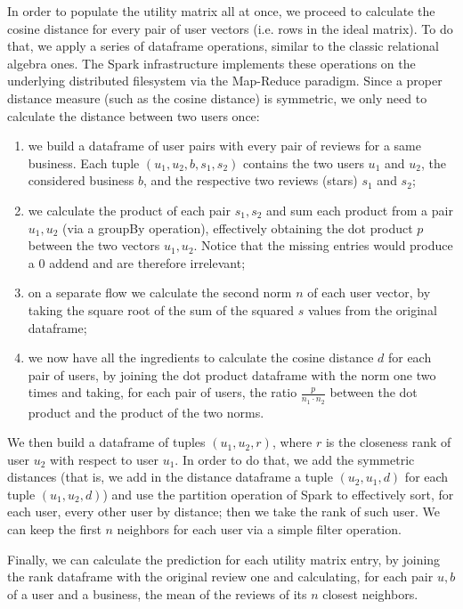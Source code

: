 \documentclass[11pt,a4paper]{article}
\begin{document}
\begin{multicols}{2}
In order to populate the utility matrix all at once, we proceed to calculate the cosine distance for every pair of user vectors (i.e. rows in the ideal matrix).
To do that, we apply a series of dataframe operations, similar to the classic relational algebra ones. The Spark infrastructure implements these operations on the underlying distributed filesystem via the Map-Reduce paradigm.
Since a proper distance measure (such as the cosine distance) is symmetric, we only need to calculate the distance between two users once:
\begin{enumerate}
	\item we build a dataframe of user pairs with every pair of reviews for a same business. Each tuple $(u_1,u_2,b,s_1,s_2)$ contains the two users $u_1$ and $u_2$, the considered business $b$, and the respective two reviews (stars) $s_1$ and $s_2$;
	\item we calculate the product of each pair $s_1,s_2$ and sum each product from a pair $u_1,u_2$ (via a groupBy operation), effectively obtaining the dot product $p$ between the two vectors $u_1,u_2$. Notice that the missing entries would produce a $0$ addend and are therefore irrelevant;
	\item on a separate flow we calculate the second norm $n$ of each user vector, by taking the square root of the sum of the squared $s$ values from the original dataframe;
	\item we now have all the ingredients to calculate the cosine distance $d$ for each pair of users, by joining the dot product dataframe with the norm one two times and taking, for each pair of users, the ratio $\frac{p}{n_1\cdot n_2}$ between the dot product and the product of the two norms.
\end{enumerate}

We then build a dataframe of tuples $(u_1,u_2,r)$, where $r$ is the closeness rank of user $u_2$ with respect to user $u_1$.
In order to do that, we add the symmetric distances (that is, we add in the distance dataframe a tuple $(u_2,u_1,d)$ for each tuple $(u_1,u_2,d)$) and use the partition operation of Spark to effectively sort, for each user, every other user by distance; then we take the rank of such user.
We can keep the first $n$ neighbors for each user via a simple filter operation.

Finally, we can calculate the prediction for each utility matrix entry, by joining the rank dataframe with the original review one and calculating, for each pair $u,b$ of a user and a business, the mean of the reviews of its $n$ closest neighbors.


\end{multicols}
\end{document}

